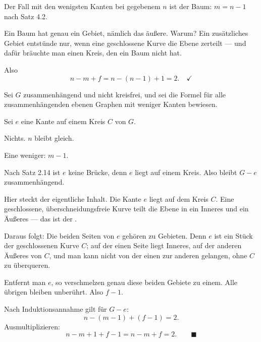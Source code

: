 \begin{merksatz}
Der Fall mit den wenigsten Kanten bei gegebenem $n$ ist der Baum: $m = n-1$ nach Satz 4.2.

Ein Baum hat genau ein Gebiet, nämlich das äußere. Warum? Ein zusätzliches Gebiet entstünde nur, wenn eine geschlossene Kurve die Ebene zerteilt --- und dafür bräuchte man einen Kreis, den ein Baum nicht hat.

Also
\[ n - m + f = n - (n-1) + 1 = 2 . \quad \checkmark \]

Sei $G$ zusammenhängend und nicht kreisfrei, und sei die Formel für alle zusammenhängenden ebenen Graphen mit weniger Kanten bewiesen.

Sei $e$ eine Kante auf einem Kreis $C$ von $G$.

Nichts. $n$ bleibt gleich.

Eine weniger: $m-1$.

Nach Satz 2.14 ist $e$ keine Brücke, denn $e$ liegt auf einem Kreis. Also bleibt $G - e$ zusammenhängend.

Hier steckt der eigentliche Inhalt. Die Kante $e$ liegt auf dem Kreis $C$. Eine geschlossene, überschneidungsfreie Kurve teilt die Ebene in ein Inneres und ein Äußeres --- das ist der .

Daraus folgt: Die beiden Seiten von $e$ gehören zu  Gebieten. Denn $e$ ist ein Stück der geschlossenen Kurve $C$; auf der einen Seite liegt Inneres, auf der anderen Äußeres von $C$, und man kann nicht von der einen zur anderen gelangen, ohne $C$ zu überqueren.

Entfernt man $e$, so verschmelzen genau diese beiden Gebiete zu einem. Alle übrigen bleiben unberührt. Also $f - 1$.

Nach Induktionsannahme gilt für $G-e$:
\[ n - (m-1) + (f-1) = 2 . \]
Ausmultiplizieren:
\[ n - m + 1 + f - 1 = n - m + f = 2 . \qquad \blacksquare \]
\end{merksatz}

